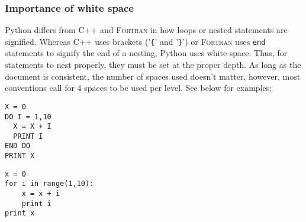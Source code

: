 \documentclass[a4paper,11pt]{report}
\begin{document}
\subsubsection{Importance of white space}

Python differs from C++ and \textsc{Fortran} in how loops or nested statements are signified. Whereas
C++ uses brackets ('\verb|{|' and '\verb|}|') or \textsc{Fortran} uses \verb|end| statements to signify the end of a
nesting, Python uses white space. Thus, for statements to nest properly, they must be set at the 
proper depth. As long as the document is consistent, the number of spaces used doesn't matter, however,
most conventions call for 4 spaces to be used per level. See below for examples:

\begin{Verbatim}[frame=single, label=\textsc{Fortran}, baselinestretch=1, fontsize=\small]
X = 0
DO I = 1,10
  X = X + I
  PRINT I
END DO
PRINT X
\end{Verbatim}

\begin{Verbatim}[frame=single, label=Python, baselinestretch=1, fontsize=\small]
x = 0
for i in range(1,10):
    x = x + i
    print i
print x
\end{Verbatim}




\end{document}
